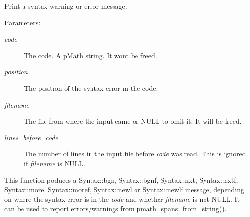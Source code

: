 Print a syntax warning or error message. 

\begin{Desc}
\item[Parameters:]
\begin{description}
\item[{\em code}]The code. A pMath string. It wont be freed. \item[{\em position}]The position of the syntax error in the code. \item[{\em filename}]The file from where the input came or NULL to omit it. It will be freed. \item[{\em lines\_\-before\_\-code}]The number of lines in the input file before {\em code\/} was read. This is ignored if {\em filename\/} is NULL.\end{description}
\end{Desc}
This function poduces a Syntax::bgn, Syntax::bgnf, Syntax::nxt, Syntax::nxtf, Syntax::more, Syntax::moref, Syntax::newl or Syntax::newlf message, depending on where the syntax error is in the {\em code\/} and whether {\em filename\/} is not NULL. It can be used to report errors/warnings from \hyperlink{group__parser_g877ac507e27c8791a265105f796f3cef}{pmath\_\-spans\_\-from\_\-string()}. 